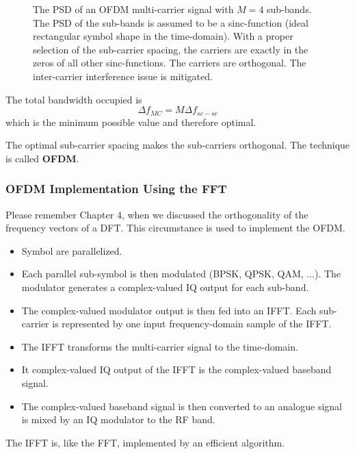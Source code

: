 \begin{refsection}
\begin{figure}[H]
	\caption[The \acs{PSD} of an \acs{OFDM} multi-carrier signal]{The \acs{PSD} of an \acs{OFDM} multi-carrier signal with $M = 4$ sub-bands. The \ac{PSD} of the sub-bands is assumed to be a sinc-function (ideal rectangular symbol shape in the time-domain). With a proper selection of the sub-carrier spacing, the carriers are exactly in the zeros of all other sinc-functions. The carriers are orthogonal. The inter-carrier interference issue is mitigated.}
\end{figure}

The total bandwidth occupied is
\begin{equation}
	\Delta f_{MC} = M \Delta f_{sc-sc}
\end{equation}
which is the minimum possible value and therefore optimal.

The optimal sub-carrier spacing makes the sub-carriers orthogonal. The technique is called  \textbf{\acf{OFDM}}.

\subsubsection{OFDM Implementation Using the FFT}

Please remember Chapter 4, when we discussed the orthogonality of the frequency vectors of a \ac{DFT}. This circumstance is used to implement the \ac{OFDM}.
\begin{itemize}
	\item Symbol are parallelized.
	\item Each parallel sub-symbol is then modulated (\acs{BPSK}, \acs{QPSK}, \acs{QAM}, ...). The modulator generates a complex-valued IQ output for each sub-band.
	\item The complex-valued modulator output is then fed into an \ac{IFFT}. Each sub-carrier is represented by one input frequency-domain sample of the \ac{IFFT}.
	\item The \ac{IFFT} transforms the multi-carrier signal to the time-domain.
	\item It complex-valued IQ output of the \ac{IFFT} is the complex-valued baseband signal.
	\item The complex-valued baseband signal is then converted to an analogue signal is mixed by an IQ modulator to the \ac{RF} band.
\end{itemize}
The \ac{IFFT} is, like the \ac{FFT}, implemented by an efficient algorithm.


\end{refsection}
